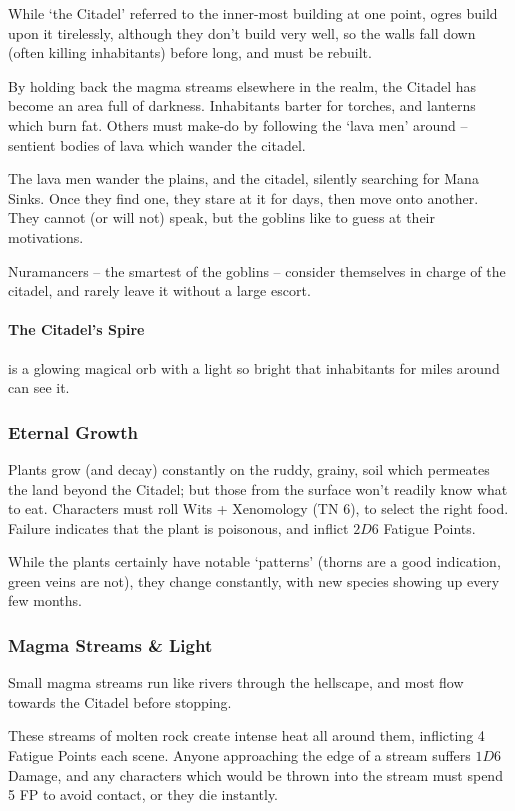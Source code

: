 \begin{multicols}{2}
While `the Citadel' referred to the inner-most building at one point, ogres build upon it tirelessly, although they don't build very well, so the walls fall down (often killing inhabitants) before long, and must be rebuilt.

By holding back the magma streams elsewhere in the realm, the Citadel has become an area full of darkness.
Inhabitants barter for torches, and lanterns which burn fat.
Others must make-do by following the `lava men' around -- sentient bodies of lava which wander the citadel.

The lava men wander the plains, and the citadel, silently searching for Mana Sinks.
Once they find one, they stare at it for days, then move onto another.
They cannot (or will not) speak, but the goblins like to guess at their motivations.

Nuramancers -- the smartest of the goblins -- consider themselves in charge of the citadel, and rarely leave it without a large escort.

\paragraph{The Citadel's Spire}
is a glowing magical orb with a light so bright that inhabitants for miles around can see it.

\subsubsection{Eternal Growth}

Plants grow (and decay) constantly on the ruddy, grainy, soil which permeates the land beyond the Citadel; but those from the surface won't readily know what to eat.
Characters must roll Wits + Xenomology (TN 6), to select the right food.
Failure indicates that the plant is poisonous, and inflict $2D6$ Fatigue Points.

While the plants certainly have notable `patterns' (thorns are a good indication, green veins are not), they change constantly, with new species showing up every few months.

\subsubsection{Magma Streams \& Light}

Small magma streams run like rivers through the hellscape, and most flow towards the Citadel before stopping.

These streams of molten rock create intense heat all around them, inflicting 4 Fatigue Points each scene.
Anyone approaching the edge of a stream suffers $1D6$ Damage, and any characters which would be thrown into the stream must spend 5 FP to avoid contact, or they die instantly.


\end{multicols}
